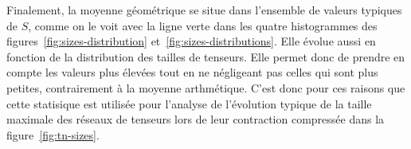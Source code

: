 Finalement, la moyenne géométrique se situe dans l'ensemble de valeurs typiques de $S$, comme on le voit avec la ligne verte dans les quatre histogrammes des figures~\ref{fig:sizes-distribution} et~\ref{fig:sizes-distributions}.
Elle évolue aussi en fonction de la distribution des tailles de tenseurs.
Elle permet donc de prendre en compte les valeurs plus élevées tout en ne négligeant pas celles qui sont plus petites, contrairement à la moyenne arthmétique.
C'est donc pour ces raisons que cette statisique est utilisée pour l'analyse de l'évolution typique de la taille maximale des réseaux de tenseurs lors de leur contraction compressée dans la figure~\ref{fig:tn-sizes}.
